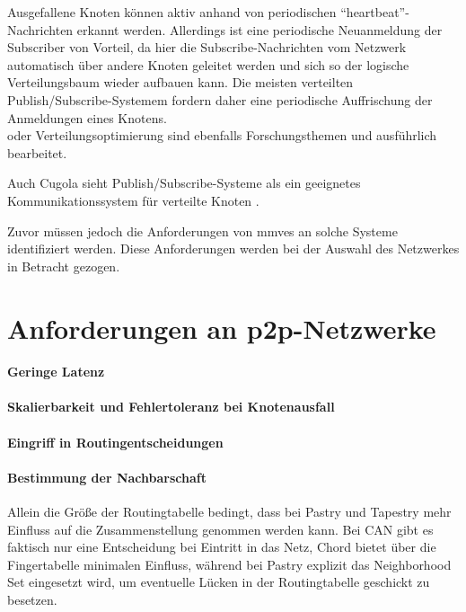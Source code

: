 Ausgefallene Knoten können aktiv anhand von periodischen \enquote{heartbeat}-Nachrichten erkannt werden. Allerdings ist eine periodische Neuanmeldung der Subscriber von Vorteil, da hier die Subscribe-Nachrichten vom Netzwerk automatisch über andere Knoten geleitet werden und sich so der logische Verteilungsbaum wieder aufbauen kann. Die meisten verteilten Publish/Subscribe-Systemem fordern daher eine periodische Auffrischung der Anmeldungen eines Knotens.\\

oder Verteilungsoptimierung \cite{Muhl2002LargeScale} sind ebenfalls Forschungsthemen und ausführlich bearbeitet.

Auch Cugola sieht Publish/Subscribe-Systeme als ein geeignetes Kommunikationssystem für verteilte Knoten \cite{Cugola2002Using}.


Zuvor müssen jedoch die Anforderungen von \acp{mmve} an solche Systeme identifiziert werden. Diese Anforderungen werden bei der Auswahl des Netzwerkes in Betracht gezogen.

\section{Anforderungen an p2p-Netzwerke}

\paragraph{Geringe Latenz} 

\paragraph{Skalierbarkeit und Fehlertoleranz bei Knotenausfall} 

\paragraph{Eingriff in Routingentscheidungen} 

\paragraph{Bestimmung der Nachbarschaft}
Allein die Größe der Routingtabelle bedingt, dass bei Pastry und Tapestry mehr Einfluss auf die Zusammenstellung genommen werden kann. Bei CAN gibt es faktisch nur eine Entscheidung bei Eintritt in das Netz, Chord bietet über die Fingertabelle minimalen Einfluss, während bei Pastry explizit das Neighborhood Set eingesetzt wird, um eventuelle Lücken in der Routingtabelle geschickt zu besetzen.


